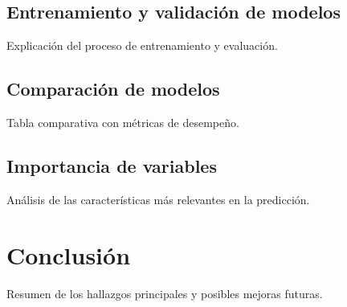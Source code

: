 \documentclass[12pt,a4paper,onecolumn]{article}
\begin{document}
\subsection{Entrenamiento y validación de modelos}
Explicación del proceso de entrenamiento y evaluación.

\subsection{Comparación de modelos}
Tabla comparativa con métricas de desempeño.

\subsection{Importancia de variables}
Análisis de las características más relevantes en la predicción.

\section{Conclusión}
Resumen de los hallazgos principales y posibles mejoras futuras.


\pagebreak
\singlespacing
\nocite{*}


\end{document}

